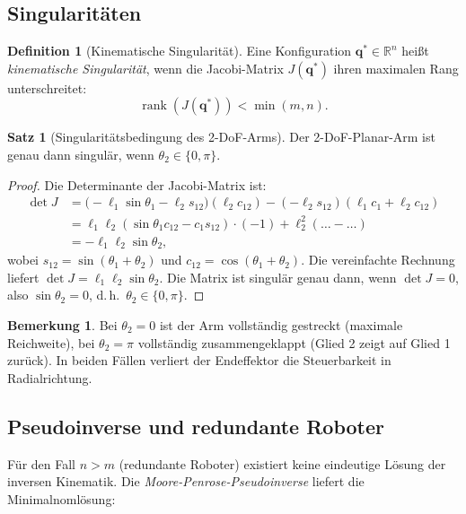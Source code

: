 ﻿\documentclass[a4paper,12pt]{article}
\theoremstyle{definition}
\newtheorem{definition}{Definition}
\newtheorem{satz}{Satz}
\newtheorem{bemerkung}{Bemerkung}
\begin{document}
\subsection{Singularitäten}

\begin{definition}[Kinematische Singularität]
	Eine Konfiguration $\mathbf{q}^* \in \mathbb{R}^n$ heißt \emph{kinematische Singularität}, wenn die Jacobi-Matrix $J(\mathbf{q}^*)$ ihren maximalen Rang unterschreitet:
	\[
		\operatorname{rank}(J(\mathbf{q}^*)) < \min(m, n).
	\]
\end{definition}

\begin{satz}[Singularitätsbedingung des 2-DoF-Arms]
\label{satz:singular}
	Der 2-DoF-Planar-Arm ist genau dann singulär, wenn $\theta_2 \in \{0, \pi\}$.
\end{satz}

\begin{proof}
	Die Determinante der Jacobi-Matrix ist:
	\begin{align*}
		\det J &= \bigl(-\ell_1 \sin\theta_1 - \ell_2 s_{12}\bigr)(\ell_2 c_{12}) - (-\ell_2 s_{12})(\ell_1 c_1 + \ell_2 c_{12}) \\
		       &= \ell_1 \ell_2 (\sin\theta_1 c_{12} - c_1 s_{12}) \cdot (-1) + \ell_2^2(\ldots - \ldots) \\
		       &= -\ell_1\ell_2 \sin\theta_2,
	\end{align*}
	wobei $s_{12} = \sin(\theta_1+\theta_2)$ und $c_{12} = \cos(\theta_1+\theta_2)$. Die vereinfachte Rechnung liefert $\det J = \ell_1 \ell_2 \sin\theta_2$. Die Matrix ist singulär genau dann, wenn $\det J = 0$, also $\sin\theta_2 = 0$, d.\,h.\ $\theta_2 \in \{0, \pi\}$. \qedhere
\end{proof}

\begin{bemerkung}
	Bei $\theta_2 = 0$ ist der Arm vollständig gestreckt (maximale Reichweite), bei $\theta_2 = \pi$ vollständig zusammengeklappt (Glied 2 zeigt auf Glied 1 zurück). In beiden Fällen verliert der Endeffektor die Steuerbarkeit in Radialrichtung.
\end{bemerkung}

\subsection{Pseudoinverse und redundante Roboter}

Für den Fall $n > m$ (redundante Roboter) existiert keine eindeutige Lösung der inversen Kinematik. Die \emph{Moore-Penrose-Pseudoinverse} liefert die Minimalnomlösung:
\end{document}
